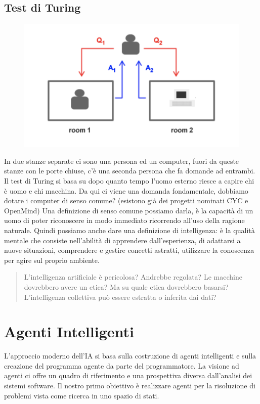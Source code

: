 \documentclass{article}
\begin{document}
\subsection{Test di Turing}
\begin{figure}[H]
    \centering
    \includegraphics[scale=0.4]{Images/testdituring.png}
\end{figure}
In due stanze separate ci sono una persona ed un computer, fuori da queste stanze con le porte chiuse, c'è una seconda persona che fa domande ad entrambi. Il test di Turing si basa su dopo quanto tempo l'uomo esterno riesce a capire chi è uomo e chi macchina. \newline
Da qui ci viene una domanda fondamentale, dobbiamo dotare i computer di senso comune? (esistono già dei progetti nominati CYC e OpenMind) Una definizione di senso comune possiamo darla, è la capacità di un uomo di poter riconoscere in modo immediato ricorrendo all'uso della ragione naturale. Quindi possiamo anche dare una definizione di intelligenza: è la qualità mentale che consiste nell'abilità di apprendere dall'esperienza, di adattarsi a nuove situazioni, comprendere e gestire concetti astratti, utilizzare la conoscenza per agire sul proprio ambiente.

\begin{quote}
    L'intelligenza artificiale è pericolosa? Andrebbe regolata? Le macchine dovrebbero avere un etica? Ma su quale etica dovrebbero basarsi? L'intelligenza collettiva può essere estratta o inferita dai dati?
\end{quote}

\section{Agenti Intelligenti}
L'approccio moderno dell'IA si basa sulla costruzione di agenti intelligenti e sulla creazione del programma agente da parte del programmatore. La visione ad agenti ci offre un quadro di riferimento e una prospettiva diversa dall'analisi dei sistemi software. Il nostro primo obiettivo è realizzare agenti per la risoluzione di problemi vista come ricerca in uno spazio di stati.
\end{document}
